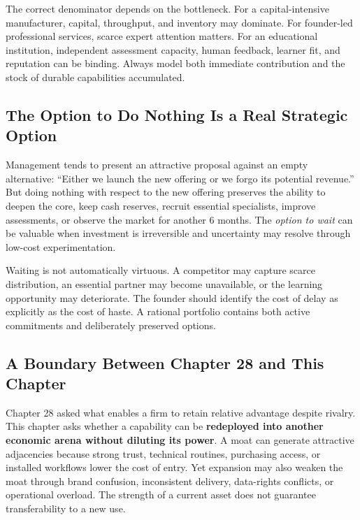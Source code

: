 The correct denominator depends on the bottleneck. For a capital-intensive manufacturer, capital, throughput, and inventory may dominate. For founder-led professional services, scarce expert attention matters. For an educational institution, independent assessment capacity, human feedback, learner fit, and reputation can be binding. Always model both immediate contribution and the stock of durable capabilities accumulated.

\subsection{The Option to Do Nothing Is a Real Strategic Option}
\label{sec:option_to_do_nothing}

Management tends to present an attractive proposal against an empty alternative: ``Either we launch the new offering or we forgo its potential revenue.'' But doing nothing with respect to the new offering preserves the ability to deepen the core, keep cash reserves, recruit essential specialists, improve assessments, or observe the market for another 6 months. The \textit{option to wait} can be valuable when investment is irreversible and uncertainty may resolve through low-cost experimentation.

Waiting is not automatically virtuous. A competitor may capture scarce distribution, an essential partner may become unavailable, or the learning opportunity may deteriorate. The founder should identify the cost of delay as explicitly as the cost of haste. A rational portfolio contains both active commitments and deliberately preserved options.

\subsection{A Boundary Between Chapter 28 and This Chapter}
\label{sec:boundary_ch28_and_ch29}

Chapter 28 asked what enables a firm to retain relative advantage despite rivalry. This chapter asks whether a capability can be \textbf{redeployed into another economic arena without diluting its power}. A moat can generate attractive adjacencies because strong trust, technical routines, purchasing access, or installed workflows lower the cost of entry. Yet expansion may also weaken the moat through brand confusion, inconsistent delivery, data-rights conflicts, or operational overload. The strength of a current asset does not guarantee transferability to a new use.
